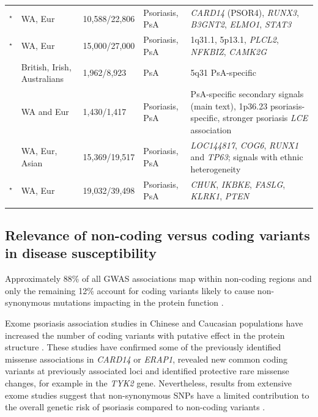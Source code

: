 \begin{landscape}
\begin{center}
\begin{longtable}[ht]{p{.25\textheight} p{.25\textheight} p{.20\textheight} p{.20\textheight} p{.50\textheight}}
\parencite{Tsoi2012}$^\star$ & WA, Eur & 10,588/22,806 & Psoriasis, PsA & \textit{CARD14} (PSOR4), \textit{RUNX3}, \textit{B3GNT2}, \textit{ELMO1}, \textit{STAT3} \\

\parencite{Tsoi2015}$^\star$	& WA, Eur	& 15,000/27,000	& Psoriasis, PsA	& 1q31.1, 5p13.1, \textit{PLCL2}, \textit{NFKBIZ}, \textit{CAMK2G} \\

\parencite{Bowes2015} &	British, Irish, Australians	& 1,962/8,923	& PsA	& 5q31 PsA-specific \\

\parencite{Stuart2015} &	WA and Eur	& 1,430/1,417	& Psoriasis, PsA	& PsA-specific secondary signals (main text), 1p36.23 psoriasis-specific, stronger psoriasis \textit{LCE} association\\

\parencite{Yin2015} &	WA, Eur, Asian	&  15,369/19,517 & Psoriasis, PsA	& \textit{LOC144817}, \textit{COG6}, \textit{RUNX1} and \textit{TP63}; signals with ethnic heterogeneity \\

\parencite{Tsoi2017}$^\star$ &	WA, Eur	& 19,032/39,498	& Psoriasis, PsA	& \textit{CHUK}, \textit{IKBKE}, \textit{FASLG}, \textit{KLRK1}, \textit{PTEN} \\																		
\bottomrule
\medskip
\end{longtable}
\end{center}
\end{landscape}



\subsection{Relevance of non-coding versus coding variants in disease susceptibility}

Approximately 88\% of all GWAS associations map within non-coding regions and only the remaining 12\% account for coding variants likely to cause non-synonymous mutations impacting in the protein function \parencite{Welter2013}.

Exome psoriasis association studies in Chinese and Caucasian populations have increased the number of coding variants with putative effect in the protein structure \parencite{Tang2014,Zuo2015,Dand2017}. These studies have confirmed some of the previously identified missense associations in \textit{CARD14} or \textit{ERAP1}, revealed new common coding variants at previously associated loci and identified protective rare missense changes, for example in the \textit{TYK2} gene\parencite{Tang2014,Dand2017}. Nevertheless, results from extensive exome studies suggest that non-synonymous SNPs have a limited contribution to the overall genetic risk of psoriasis compared to non-coding variants \parencite{Tang2014}.

